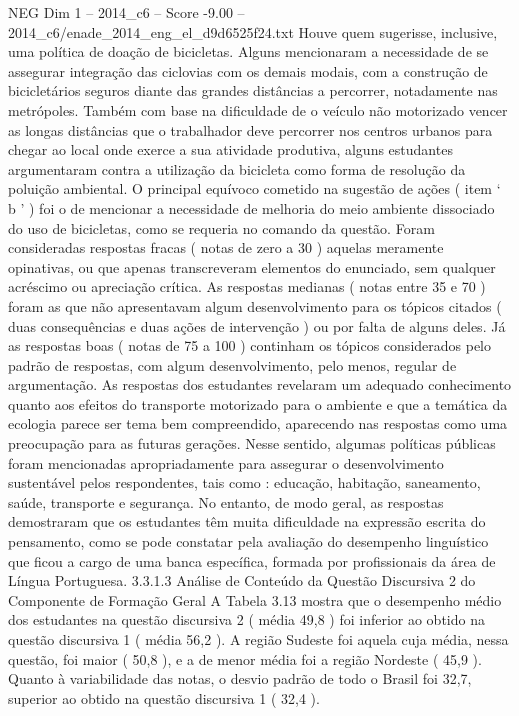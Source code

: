 \begin{textsample}{NEG Dim 1 – 2014\_c6 – Score -9.00 – 2014\_c6/enade\_2014\_eng\_el\_d9d6525f24.txt}
Houve quem sugerisse, inclusive, uma política de doação de bicicletas.
Alguns mencionaram a necessidade de se assegurar integração das ciclovias com os demais modais, com a construção de bicicletários seguros diante das grandes distâncias a percorrer, notadamente nas metrópoles.
Também com base na dificuldade de o veículo não motorizado vencer as longas distâncias que o trabalhador deve percorrer nos centros urbanos para chegar ao local onde exerce a sua atividade produtiva, alguns estudantes argumentaram contra a utilização da bicicleta como forma de resolução da poluição ambiental.
O principal equívoco cometido na sugestão de ações ( item ‘ b ’ ) foi o de mencionar a necessidade de melhoria do meio ambiente dissociado do uso de bicicletas, como se requeria no comando da questão.
Foram consideradas respostas fracas ( notas de zero a 30 ) aquelas meramente opinativas, ou que apenas transcreveram elementos do enunciado, sem qualquer acréscimo ou apreciação crítica.
As respostas medianas ( notas entre 35 e 70 ) foram as que não apresentavam algum desenvolvimento para os tópicos citados ( duas consequências e duas ações de intervenção ) ou por falta de alguns deles.
Já as respostas boas ( notas de 75 a 100 ) continham os tópicos considerados pelo padrão de respostas, com algum desenvolvimento, pelo menos, regular de argumentação.
As respostas dos estudantes revelaram um adequado conhecimento quanto aos efeitos do transporte motorizado para o ambiente e que a temática da ecologia parece ser tema bem compreendido, aparecendo nas respostas como uma preocupação para as futuras gerações.
Nesse sentido, algumas políticas públicas foram mencionadas apropriadamente para assegurar o desenvolvimento sustentável pelos respondentes, tais como : educação, habitação, saneamento, saúde, transporte e segurança.
No entanto, de modo geral, as respostas demostraram que os estudantes têm muita dificuldade na expressão escrita do pensamento, como se pode constatar pela avaliação do desempenho linguístico que ficou a cargo de uma banca específica, formada por profissionais da área de Língua Portuguesa. 3.3.1.3 Análise de Conteúdo da Questão Discursiva 2 do Componente de Formação Geral A Tabela 3.13 mostra que o desempenho médio dos estudantes na questão discursiva 2 ( média 49,8 ) foi inferior ao obtido na questão discursiva 1 ( média 56,2 ).
A região Sudeste foi aquela cuja média, nessa questão, foi maior ( 50,8 ), e a de menor média foi a região Nordeste ( 45,9 ).
Quanto à variabilidade das notas, o desvio padrão de todo o Brasil foi 32,7, superior ao obtido na questão discursiva 1 ( 32,4 ).

\end{textsample}
